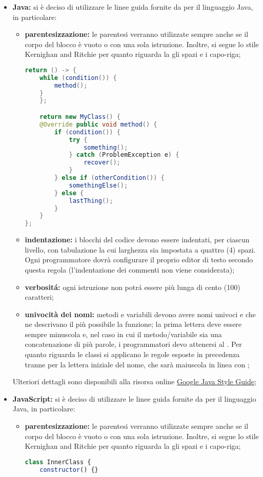 					\begin{itemize}
						\item \textbf{Java:} si è deciso di utilizzare le linee guida fornite da  per il linguaggio Java, in particolare:
							\begin{itemize}
								\item \textbf{parentesizzazione:} le parentesi verranno utilizzate sempre anche se il corpo del blocco è vuoto o con una sola istruzione. Inoltre, si segue lo stile Kernighan and Ritchie per quanto riguarda la gli spazi e i capo-riga;
									\begin{lstlisting}[language=java,captionpos=b,caption={Esempio per la sintassi Java}]
return () -> {
	while (condition()) {
		method();
	}
	};

	return new MyClass() {
	@Override public void method() {
		if (condition()) {
			try {
				something();
			} catch (ProblemException e) {
				recover();
			}
		} else if (otherCondition()) {
			somethingElse();
		} else {
			lastThing();
		}
	}
};
									\end{lstlisting}
								\item \textbf{indentazione:} i blocchi del codice devono essere indentati, per ciascun livello, con tabulazione la cui larghezza sia impostata a quattro (4) spazi. Ogni programmatore dovrà configurare il proprio editor di testo secondo questa regola (l'indentazione dei commenti non viene considerata);
								\item \textbf{verbositá:} ogni istruzione non potrá essere più lunga di cento (100) caratteri;
								\item \textbf{univocità dei nomi:} metodi e variabili devono avere nomi univoci e che ne descrivano il più possibile la funzione; la prima lettera deve essere sempre minuscola e, nel caso in cui il metodo/variabile sia una concatenazione di più parole, i programmatori devo attenersi al .
								Per quanto riguarda le classi si applicano le regole esposte in precedenza tranne per la lettera iniziale del nome, che sarà maiuscola in linea con ;

							\end{itemize}
							Ulteriori dettagli sono disponibili alla risorsa online \href{https://google.github.io/styleguide/javaguide.html}{Google Java Style Guide};
						\item \textbf{JavaScript:} si è deciso di utilizzare le linee guida fornite da  per il linguaggio Java, in particolare:
							\begin{itemize}
								\item \textbf{parentesizzazione:} le parentesi verranno utilizzate sempre anche se il corpo del blocco è vuoto o con una sola istruzione. Inoltre, si segue lo stile Kernighan and Ritchie per quanto riguarda la gli spazi e i capo-riga;
								\begin{lstlisting}[language=JavaScript,captionpos=b,caption={Esempio per la sintassi JavaScript}]
class InnerClass {
	constructor() {}


\end{lstlisting}
\end{itemize}
\end{itemize}
